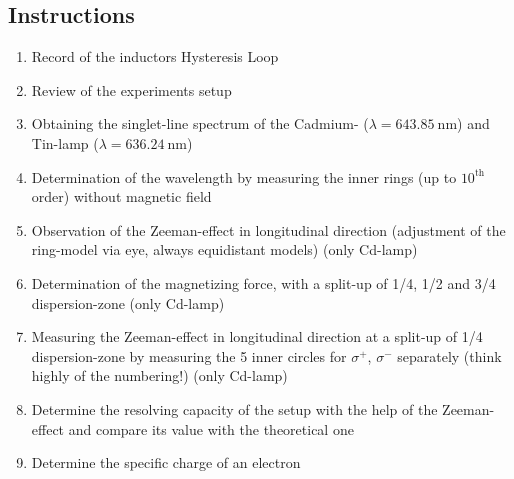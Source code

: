\subsection{Instructions}
\label{toc:Instructions}

\begin{enumerate}
	\item{
	Record of the inductors Hysteresis Loop
	}
	\item{
	Review of the experiments setup
	}
	\item{
	Obtaining the singlet-line spectrum of the Cadmium- ($\lambda= \SI{643.85}{\nano\meter}$) and Tin-lamp ($\lambda= \SI{636.24}{\nano\meter}$)
	}
	\item{
	Determination of the wavelength by measuring the inner rings (up to $10^{\text{th}}$ order) without magnetic field
	}
	\item{
	Observation of the Zeeman-effect in longitudinal direction (adjustment of the ring-model via eye, always equidistant models) (only Cd-lamp)
	}
	\item{
	Determination of the magnetizing force, with a split-up of 1/4, 1/2 and 3/4 dispersion-zone (only Cd-lamp)
	}
	\item{
	Measuring the Zeeman-effect in longitudinal direction at a split-up of 1/4 dispersion-zone by measuring the 5 inner circles for $\sigma^{+}$, $\sigma^{-}$ separately (think highly of the numbering!) (only Cd-lamp)
	}
	\item{
	Determine the resolving capacity of the setup with the help of the Zeeman-effect and compare its value with the theoretical one
	}
	\item{
	Determine the specific charge of an electron 
	}
\end{enumerate}






